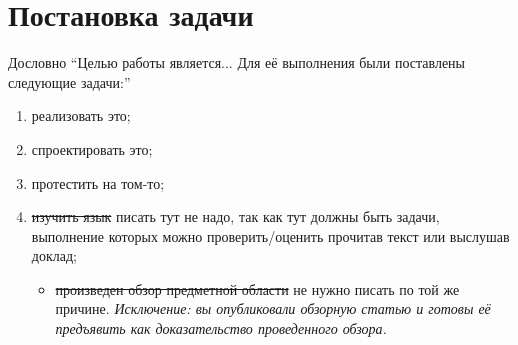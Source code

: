 
\section{Постановка задачи}
\label{sec:task}
Дословно \enquote{Целью работы является... Для её выполнения были постав\-лены следующие задачи:}
\begin{enumerate}
	\item  реализовать это;
	\item  спроектировать это;
	\item  протестить на том-то;
	\item \sout{изучить язык \OCaml{}} писать тут не надо, так как тут должны быть задачи, выполнение которых можно проверить/оценить прочитав текст или выслушав доклад;
	      \begin{itemize}
		      \item \sout{произведен обзор предметной области} не нужно писать по той же причине. \emph{Исключение: вы опубликовали обзорную статью и готовы её предъявить как доказательство проведенного обзора.}
	      \end{itemize}
\end{enumerate}
